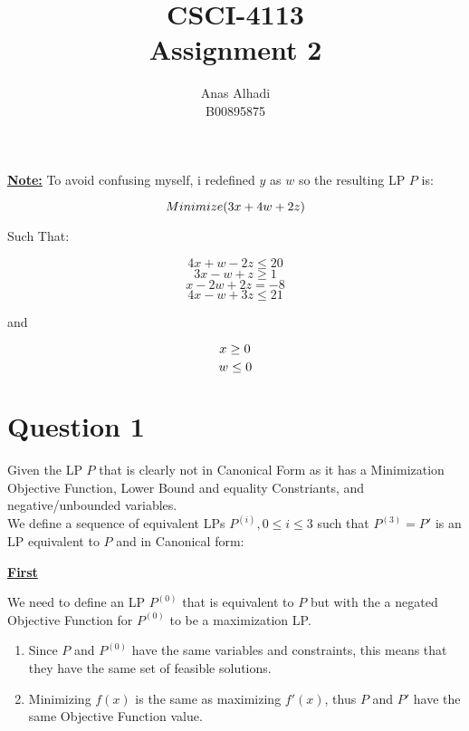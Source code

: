 \documentclass{article}
\title{\textbf{CSCI-4113\\Assignment 2}}
\author{Anas Alhadi\\B00895875}
\numberwithin{equation}{subsection}
\begin{document}
	\maketitle
	\tableofcontents

	\newpage 

	\par{
	 	\textbf{\underline{Note:}} To avoid confusing myself, i redefined $y$ as $w$ 
		so the resulting LP $P$ is:
	}


	\begin{equation}\notag
		Minimize(3x+4w+2z)
	\end{equation}

	Such That:

	\begin{equation}\label{q1-1}\tag{1}
		4x+w-2z \leq 20
	\end{equation}
	\begin{equation}\tag{2}
		3x - w +z \ge 1 
	\end{equation}
	\begin{equation}\label{q1-3}\tag{3}
		x-2w+2z = -8
	\end{equation}
	\begin{equation}\tag{4}
		4x-w+3z \leq 21
	\end{equation}

	and
	
	\begin{equation}\notag
		x\ge 0
	\end{equation}
	\begin{equation}\notag
		w \le 0
	\end{equation}

	\newpage
	\section{Question 1}
	\par{Given the LP $P$ that is clearly not in Canonical Form as it has a 
	Minimization Objective Function, Lower Bound and equality Constriants, and negative/unbounded variables.\\We define a 
	sequence of equivalent LPs $P^{(i)}, 0\leq i\leq3$ such that $P^{(3)}=P'$ is an 
	LP equivalent to $P$ and in Canonical form:}


	\vspace{15pt}
	\textbf{\underline{First}}
	\par{
		We need to define an LP $P^{(0)}$ that is equivalent to $P$ but with the a negated
		Objective Function for $P^{(0)}$ to be a maximization LP. 
	}
	\begin{enumerate}
		\item Since $P$ and $P^{(0)}$ have the same variables and constraints, 
			this means that they have the same set of feasible solutions.
		\item Minimizing $f(x)$ is the same as maximizing $f'(x)$, thus $P$ and 
			$P'$ have the same Objective Function value.
	\end{enumerate}
\end{document}

